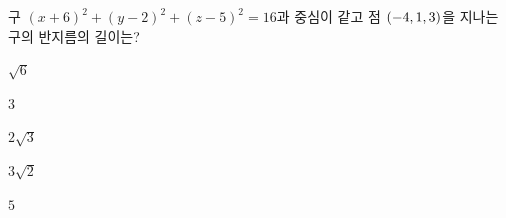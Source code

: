 구 $(x+6)^2+(y-2)^2+(z-5)^2=16$과 중심이 같고 점 $(-4{,}\mkern3mu\mathopen{}1{,}\mkern3mu\mathopen{}3)$을 지나는 구의 반지름의 길이는?
\begin{choices32}{\rule[-3ex]{0pt}{8ex}$\sqrt{6}$}{\rule[-3ex]{0pt}{8ex}$3$}{\rule[-3ex]{0pt}{8ex}$2\sqrt{3}$}{\rule[-3ex]{0pt}{8ex}$3\sqrt{2}$}{\rule[-3ex]{0pt}{8ex}$5$}\end{choices32}
